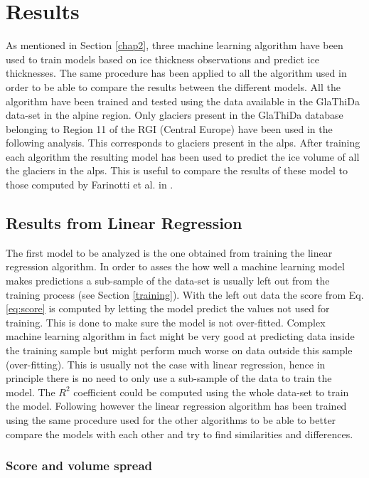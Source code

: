 \chapter{Results}\label{chap3}
\thispagestyle{plain}

As mentioned in Section \ref{chap2}, three machine learning algorithm have been used to train models based on ice thickness observations and predict ice thicknesses. The same procedure has been applied to all the algorithm used in order to be able to compare the results between the different models. 
All the algorithm have been trained and tested using the data available in the GlaThiDa data-set in the alpine region. Only glaciers present in the GlaThiDa database belonging to Region 11 of the RGI (Central Europe) have been used in the following analysis. This corresponds to glaciers present in the alps. 
After training each algorithm the resulting model has been used to predict the ice volume of all the glaciers in the alps. This is useful to compare the results of these model to those computed by Farinotti et al. in \citet{Farinotti2019}.

\section{Results from Linear Regression}\label{linear}
The first model to be analyzed is the one obtained from training the linear regression algorithm. In order to asses the how well a machine learning model makes predictions a sub-sample of the data-set is usually left out from the training process (see Section \ref{training}). With the left out data the score from Eq. \ref{eq:score} is computed by letting the model predict the values not used for training. This is done to make sure the model is not over-fitted. Complex machine learning algorithm in fact might be very good at predicting data inside the training sample but might perform much worse on data outside this sample (over-fitting). 
This is usually not the case with linear regression, hence in principle there is no need to only use a sub-sample of the data to train the model. The $R^2$ coefficient could be computed using the whole data-set to train the model. Following however the linear regression algorithm has been trained using the same procedure used for the other algorithms to be able to better compare the models with each other and try to find similarities and differences.     

\subsection{Score and volume spread}\label{lr-score}

